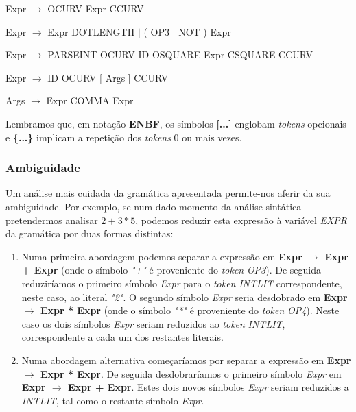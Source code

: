 \documentclass[11pt,a4paper]{article}
\begin{document}
\hspace{-1cm}Expr $\rightarrow$ OCURV Expr CCURV

\hspace{-1cm}Expr $\rightarrow$ Expr DOTLENGTH $\mid$ ( OP3 $\mid$ NOT ) Expr

\hspace{-1cm}Expr $\rightarrow$ PARSEINT OCURV ID OSQUARE Expr CSQUARE CCURV

\hspace{-1cm}Expr $\rightarrow$ ID OCURV [ Args ] CCURV

\hspace{-1cm}Args $\rightarrow$ Expr { COMMA Expr }

\vspace{0.5cm}

Lembramos que, em notação \textbf{ENBF}, os símbolos \textbf{[...]} englobam \emph{tokens} opcionais e \textbf{\{...\}} implicam a repetição dos \emph{tokens} 0 ou mais vezes.

\subsubsection{Ambiguidade}

Um análise mais cuidada da gramática apresentada permite-nos aferir da sua ambiguidade. Por exemplo, se num dado momento da análise sintática pretendermos analisar $2+3*5$, podemos reduzir esta expressão à variável \emph{EXPR} da gramática por duas formas distintas:

\begin{enumerate}
\item Numa primeira abordagem podemos separar a expressão em \textbf{Expr $\rightarrow$ Expr + Expr} (onde o símbolo \emph{"+"} é proveniente do \emph{token} \emph{OP3}). De seguida reduziríamos o primeiro símbolo \emph{Expr} para o \emph{token} \emph{INTLIT} correspondente, neste caso, ao literal \emph{"2"}. O segundo símbolo \emph{Expr} seria desdobrado em \textbf{Expr $\rightarrow$ Expr * Expr} (onde o símbolo \emph{"*"} é proveniente do \emph{token} \emph{OP4}). Neste caso os dois símbolos \emph{Expr} seriam reduzidos ao \emph{token} \emph{INTLIT}, correspondente a cada um dos restantes literais.

\item Numa abordagem alternativa começaríamos por separar a expressão em \textbf{Expr $\rightarrow$ Expr * Expr}. De seguida desdobraríamos o primeiro símbolo \emph{Expr} em \textbf{Expr $\rightarrow$ Expr + Expr}. Estes dois novos símbolos \emph{Expr} seriam reduzidos a \emph{INTLIT}, tal como o restante símbolo \emph{Expr}.
\end{enumerate}
\end{document}
